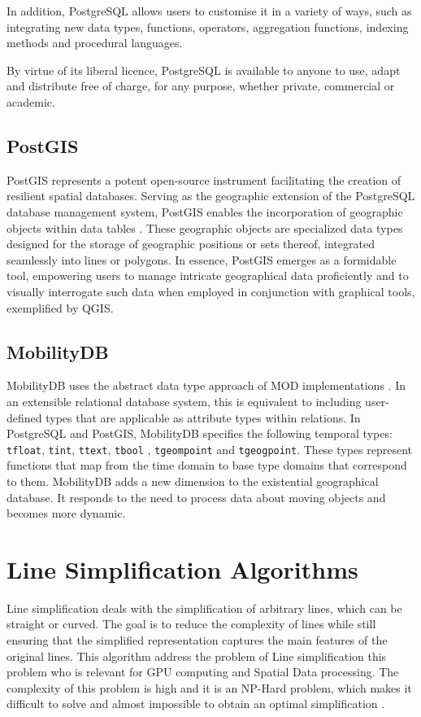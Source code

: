 In addition, PostgreSQL allows users to customise it in a variety of ways, such as integrating new data types, functions, operators, aggregation functions, indexing methods and procedural languages.

By virtue of its liberal licence, PostgreSQL is available to anyone to use, adapt and distribute free of charge, for any purpose, whether private, commercial or academic.

\subsection{PostGIS}
PostGIS represents a potent open-source instrument facilitating the creation of resilient spatial databases. Serving as the geographic extension of the PostgreSQL database management system, PostGIS enables the incorporation of geographic objects within data tables \cite{marquez2015PostGIS}. These geographic objects are specialized data types designed for the storage of geographic positions or sets thereof, integrated seamlessly into lines or polygons. In essence, PostGIS emerges as a formidable tool, empowering users to manage intricate geographical data proficiently and to visually interrogate such data when employed in conjunction with graphical tools, exemplified by QGIS.

\subsection{MobilityDB}
MobilityDB uses the abstract data type approach of MOD implementations \cite{guting2000foundation}. In an extensible relational database system, this is equivalent to including user-defined types that are applicable as attribute types within relations. In PostgreSQL and PostGIS, MobilityDB specifies the following temporal types: \texttt{tfloat}, \texttt{tint}, \texttt{ttext}, \texttt{tbool} , \texttt{tgeompoint} and \texttt{tgeogpoint}. These types represent functions that map from the time domain to base type domains that correspond to them. MobilityDB adds a new dimension to the existential geographical database. It responds to the need to process data about moving objects and becomes more dynamic.




\section{Line Simplification Algorithms}
Line simplification deals with the simplification of arbitrary lines, which can be straight or curved. The goal is to reduce the complexity of lines while still ensuring that the simplified representation captures the main features of the original lines. This algorithm address the problem of Line simplification this problem who is relevant for GPU computing and Spatial Data processing. The complexity of this problem is high and it is an NP-Hard problem, which makes it difficult to solve and almost impossible to obtain an optimal simplification \cite{kerkhof2022algorithmic}.

